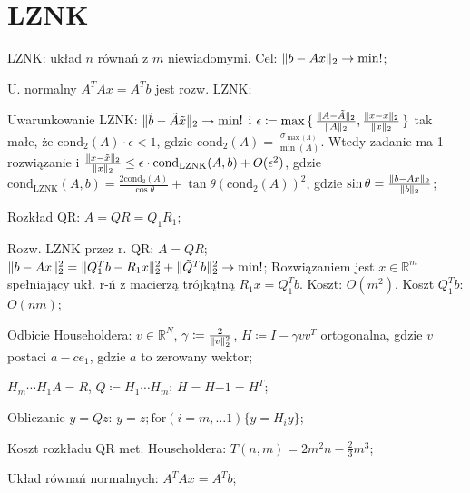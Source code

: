 \section{LZNK}

\entry
LZNK: układ $n$ równań z $m$ niewiadomymi.
Cel: $\|b - Ax\|_2 \to \min !$;

\entry
U. normalny
$A^TAx=A^Tb$
jest rozw. LZNK;

\entry
Uwarunkowanie LZNK:
$\|\tilde{b} - \tilde{A}\tilde{x}\|_2 \to \mathrm{min}!$
i $\epsilon\coloneqq \max\set{ \frac{\|A - \tilde{A}\|_2}{\|A\|_2}, \frac{\|x - \tilde{x}\|_2}{\|x\|_2} }$
tak małe, że $\mathrm{cond}_2(A)\cdot \epsilon < 1$,
gdzie $\mathrm{cond}_2(A) = \frac{\sigma_{\max(A)}}{\min(A)}$.
Wtedy zadanie ma 1 rozwiązanie i
$\frac{\|x-\tilde{x}\|_2}{\|x\|_2} \leq  \epsilon \cdot \mathrm{cond}_{\mathrm{LZNK}}(A,b)+ O(\epsilon^2)$,
gdzie $\mathrm{cond}_{\mathrm{LZNK}}(A,b) = \frac{2\mathrm{cond}_2(A)}{\cos\theta} + \tan\theta(\mathrm{cond}_2(A))^2$,
gdzie $\sin\theta=\frac{\|b-Ax\|_2}{\|b\|_2}$;

\entry
Rozkład QR:
$A = QR = Q_1R_1$;

\entry
Rozw. LZNK przez r. QR:
$A=QR$;
$\|b-Ax\|^2_2 = \|Q^T_1b-R_1x\|^2_2 + \|\tilde{Q}^Tb\|^2_2 \to \min !$;
Rozwiązaniem jest $x\in \mathbb{R}^m$ spełniający ukł. r-ń z macierzą trójkątną $R_1x=Q_1^Tb$.
Koszt: $O(m^2)$.
Koszt $Q_1^Tb$: $O(nm)$;


\entry
Odbicie Householdera:
$v\in \mathbb{R}^N$,
$\gamma \coloneqq \frac{2}{\|v\|^2_2} $,
$H\coloneqq I-\gamma vv^T$ ortogonalna, gdzie
$v$ postaci $a-ce_1$,
gdzie $a$ to zerowany wektor;

\entry
$H_m \cdots H_1 A = R$, $Q \coloneqq H_1 \cdots H_m$;
\entry
$H=H{-1}=H^T$;

\entry
Obliczanie $y=Qz$:
$y=z; \mathrm{for}(i=m,\ldots 1)\{y=H_iy\}$;

\entry
Koszt rozkładu QR met. Householdera: $T(n,m)=2m^2n - \frac{2}{3}m^3$;

\entry
Układ równań normalnych:
$A^TAx=A^Tb$;


